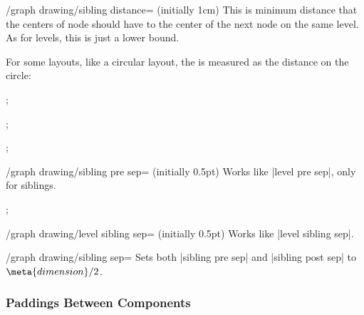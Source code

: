 \begin{key}{/graph drawing/sibling distance= (initially 1cm)}
  This is minimum distance that the centers of node should have to the
  center of the next node on the same level. As for levels, this is
  just a lower bound.

  For some layouts, like a circular layout, the  is
  measured as the distance on the circle:
\begin{codeexample}[]
\tikz {};  
\end{codeexample}
\begin{codeexample}[]
\tikz {};  
\end{codeexample}
\begin{codeexample}[]
\tikz {};  
\end{codeexample}
\end{key}


\begin{key}{/graph drawing/sibling pre sep= (initially 0.5pt)}
  Works like |level pre sep|, only for siblings.
\begin{codeexample}[]
\tikz {};  
\end{codeexample}
\end{key}
\begin{key}{/graph drawing/level sibling sep= (initially 0.5pt)}
  Works like |level sibling sep|.
\end{key}

\begin{key}{/graph drawing/sibling sep=}
  Sets both |sibling pre sep| and |sibling post sep| to
  $\meta{dimension}/2$.
\end{key}




\subsubsection{Paddings Between Components}

